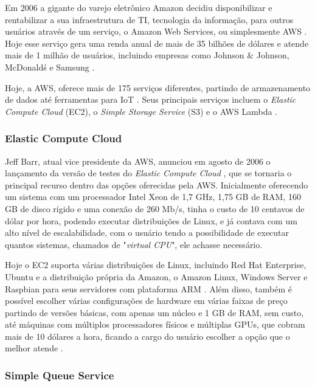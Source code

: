 \indent
\par Em 2006 a gigante do varejo eletrônico Amazon decidiu disponibilizar e rentabilizar a sua infraestrutura de TI, tecnologia da informação, para outros usuários através de um serviço, o Amazon Web Services, ou simplesmente AWS \cite{AmazonAWSAbout}. Hoje esse serviço gera uma renda anual de mais de 35 bilhões de dólares \cite{DevelpAmazonWeb} e atende mais de 1 milhão de usuários, incluindo empresas como Johnson \& Johnson, McDonald\'s e Samsung \cite{WhosUsingAWS}.
\indent
\par Hoje, a AWS, oferece mais de 175 serviços diferentes, partindo de armazenamento de dados até ferramentas para IoT \cite{TopTenAWS}. Seus principais serviços incluem o \textit{Elastic Compute Cloud} (EC2), o \textit{Simple Storage Service} (S3) e o AWS Lambda \cite{TechRadar}.

\subsubsection{Elastic Compute Cloud}

\indent
\par Jeff Barr, atual vice presidente da AWS, anunciou em agosto de 2006 o lançamento da versão de testes do \textit{Elastic Compute Cloud} \cite{AWSEC2Beta}, que se tornaria o principal recurso dentro das opções oferecidas pela AWS. Inicialmente oferecendo um sistema com um processador Intel Xeon de 1,7 GHz, 1,75 GB de RAM, 160 GB de disco rígido e uma conexão de 260 Mb/s, tinha o custo de 10 centavos de dólar por hora, podendo executar distribuições de Linux, e já contava com um alto nível de escalabilidade, com o usuário tendo a possibilidade de executar quantos sistemas, chamados de "\textit{virtual CPU}", ele achasse necessário.
\indent
\par Hoje o EC2 suporta várias distribuições de Linux, incluindo Red Hat Enterprise, Ubuntu e a distribuição própria da Amazon, o Amazon Linux, Windows Server e Raspbian para seus servidores com plataforma ARM \cite{SuppSystems}. Além disso, também é possível escolher várias configurações de hardware em várias faixas de preço partindo de versões básicas, com apenas um núcleo e 1 GB de RAM, sem custo, até máquinas com múltiplos processadores físicos e múltiplas GPUs, que cobram mais de 10 dólares a hora, ficando a cargo do usuário escolher a opção que o melhor atende \cite{AWSINSTANCE}.

\subsubsection{Simple Queue Service}

